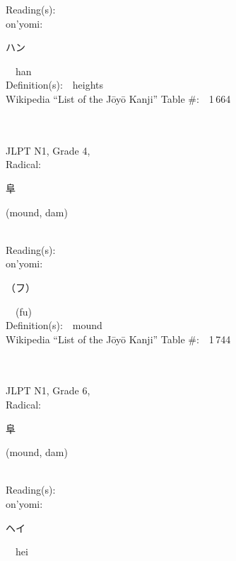 \begin{multicols}{2}
Reading(s):\ \ \\
{\hspace*{1em}}on'yomi:\ \ \\
{\hspace*{2em}}{\begin{CJK}{UTF8}{min} ハン \end{CJK}}\ \ han\ \ \\
Definition(s):\ \ heights \\
Wikipedia ``List of the J\=oy\=o Kanji'' Table \#:\ \ 1\,664 \\
\ \ \\
{\fontsize{34pt}{40pt}  }\ \ \\  %
{JLPT N1, Grade 4, \\Radical:\ \ {\begin{CJK}{UTF8}{min} 阜 \end{CJK}} (mound, dam) } \\
Reading(s):\ \ \\
{\hspace*{1em}}on'yomi:\ \ \\
{\hspace*{2em}}{\begin{CJK}{UTF8}{min} （フ） \end{CJK}}\ \ (fu)\ \ \\
Definition(s):\ \ mound \\
Wikipedia ``List of the J\=oy\=o Kanji'' Table \#:\ \ 1\,744 \\
\ \ \\
{\fontsize{34pt}{40pt}  }\ \ \\  %
{JLPT N1, Grade 6, \\Radical:\ \ {\begin{CJK}{UTF8}{min} 阜 \end{CJK}} (mound, dam) } \\
Reading(s):\ \ \\
{\hspace*{1em}}on'yomi:\ \ \\
{\hspace*{2em}}{\begin{CJK}{UTF8}{min} ヘイ \end{CJK}}\ \ hei\ \ \\

\end{multicols}
